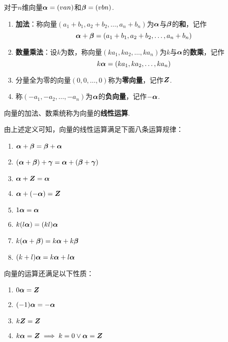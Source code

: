 \begin{definition}
对于\(n\)维向量\(\boldsymbol{\alpha} = (v{a}{n})\)和\(\boldsymbol{\beta} = (v{b}{n})\).
\begin{enumerate}
\item \textbf{加法}：称向量\((a_1+b_1,a_2+b_2,\dotsc,a_n+b_n)\)为\(\boldsymbol{\alpha}\)与\(\boldsymbol{\beta}\)的\textbf{和}，记作\[
\boldsymbol{\alpha}+\boldsymbol{\beta}=(a_1+b_1,a_2+b_2,\dotsc,a_n+b_n)
\]
\item \textbf{数量乘法}：设\(k\)为数，称向量\((k a_1, k a_2, \dotsc, k a_n)\)为\(k\)与\(\boldsymbol{\alpha}\)的\textbf{数乘}，记作\[
k\boldsymbol{\alpha} = (k a_1, k a_2, \dotsc, k a_n)
\]
\item 分量全为零的向量\((0,0,\dotsc,0)\)称为\textbf{零向量}，记作\(\boldsymbol{Z}\).
\item 称\((-a_1,-a_2,\dotsc,-a_n)\)为\(\boldsymbol{\alpha}\)的\textbf{负向量}，记作\(-\boldsymbol{\alpha}\).
\end{enumerate}

向量的加法、数乘统称为向量的\textbf{线性运算}.
\end{definition}

\begin{theorem}
由上述定义可知，向量的线性运算满足下面八条运算规律：
\begin{enumerate}
\item \(\boldsymbol{\alpha} + \boldsymbol{\beta} = \boldsymbol{\beta} + \boldsymbol{\alpha}\)
\item \((\boldsymbol{\alpha} + \boldsymbol{\beta}) + \boldsymbol{\gamma} = \boldsymbol{\alpha} + (\boldsymbol{\beta} + \boldsymbol{\gamma})\)
\item \(\boldsymbol{\alpha} + \boldsymbol{Z} = \boldsymbol{\alpha}\)
\item \(\boldsymbol{\alpha} + (-\boldsymbol{\alpha}) = \boldsymbol{Z}\)
\item \(1 \boldsymbol{\alpha} = \boldsymbol{\alpha}\)
\item \(k(l \boldsymbol{\alpha}) = (kl) \boldsymbol{\alpha}\)
\item \(k(\boldsymbol{\alpha} + \boldsymbol{\beta}) = k\boldsymbol{\alpha} + k\boldsymbol{\beta}\)
\item \((k+l)\boldsymbol{\alpha} = k\boldsymbol{\alpha} + l\boldsymbol{\alpha}\)
\end{enumerate}
\end{theorem}

\begin{property}
向量的运算还满足以下性质：
\begin{enumerate}
\item \(0 \boldsymbol{\alpha} = \boldsymbol{Z}\)
\item \((-1) \boldsymbol{\alpha} = -\boldsymbol{\alpha}\)
\item \(k \boldsymbol{Z} = \boldsymbol{Z}\)
\item \(k \boldsymbol{\alpha} = \boldsymbol{Z} \implies k = 0 \lor \boldsymbol{\alpha} = \boldsymbol{Z}\)
\end{enumerate}
\end{property}

